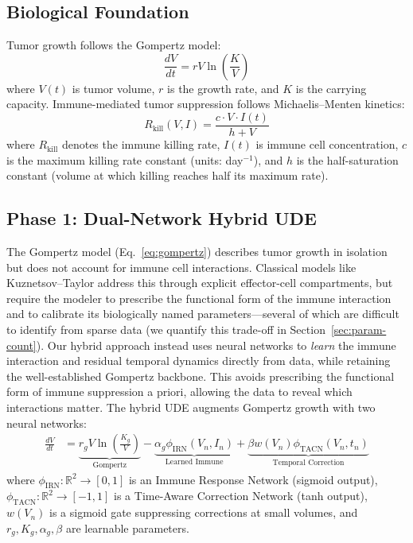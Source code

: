 \documentclass{juliacon}
\begin{document}
\subsection{Biological Foundation}

Tumor growth follows the Gompertz model:
\begin{equation}
\frac{dV}{dt} = rV\ln\left(\frac{K}{V}\right)
\label{eq:gompertz}
\end{equation}
where $V(t)$ is tumor volume, $r$ is the growth rate, and $K$ is the carrying capacity. Immune-mediated tumor suppression follows Michaelis--Menten kinetics:
\begin{equation}
R_{\text{kill}}(V, I) = \frac{c \cdot V \cdot I(t)}{h + V}
\label{eq:michaelis_menten_killing}
\end{equation}
where $R_{\text{kill}}$ denotes the immune killing rate, $I(t)$ is immune cell concentration, $c$ is the maximum killing rate constant (units: day$^{-1}$), and $h$ is the half-saturation constant (volume at which killing reaches half its maximum rate).

\subsection{Phase 1: Dual-Network Hybrid UDE}

The Gompertz model (Eq.~\ref{eq:gompertz}) describes tumor growth in isolation but does not account for immune cell interactions. Classical models like Kuznetsov--Taylor \cite{kuznetsov1994} address this through explicit effector-cell compartments, but require the modeler to prescribe the functional form of the immune interaction and to calibrate its biologically named parameters---several of which are difficult to identify from sparse data (we quantify this trade-off in Section~\ref{sec:param-count}). Our hybrid approach instead uses neural networks to \emph{learn} the immune interaction and residual temporal dynamics directly from data, while retaining the well-established Gompertz backbone. This avoids prescribing the functional form of immune suppression a priori, allowing the data to reveal which interactions matter. The hybrid UDE augments Gompertz growth with two neural networks:
\begin{align}
\frac{dV}{dt} &= \underbrace{r_g V \ln\left(\frac{K_g}{V}\right)}_{\text{Gompertz}} - \underbrace{\alpha_g \phi_{\text{IRN}}(V_n, I_n)}_{\text{Learned Immune}} + \underbrace{\beta w(V_n) \phi_{\text{TACN}}(V_n, t_n)}_{\text{Temporal Correction}}
\label{eq:dual_network_ude}
\end{align}
where $\phi_{\text{IRN}}: \mathbb{R}^2 \rightarrow [0,1]$ is an Immune Response Network (sigmoid output), $\phi_{\text{TACN}}: \mathbb{R}^2 \rightarrow [-1,1]$ is a Time-Aware Correction Network (tanh output), $w(V_n)$ is a sigmoid gate suppressing corrections at small volumes, and $r_g, K_g, \alpha_g, \beta$ are learnable parameters.
\end{document}
